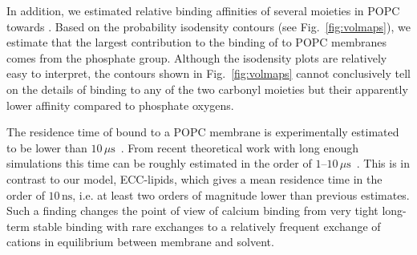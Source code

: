 \documentclass[aip,jcp,twocolumn]{revtex4}
\begin{document}
In addition, we estimated relative binding affinities 
of several moieties in POPC towards . 
Based on the probability isodensity contours (see Fig.~\ref{fig:volmaps}), 
we estimate that the largest contribution
to the binding of  to POPC membranes comes from the phosphate group. 
Although the isodensity plots are relatively easy to interpret,
the contours shown in Fig.~\ref{fig:volmaps} cannot conclusively tell on the details
of  binding to any of the two carbonyl moieties
but their apparently lower affinity compared to phosphate oxygens. 

The residence time of  bound to a POPC membrane 
is experimentally estimated to be lower than $10\,\mu\mathrm{s}$~\cite{altenbach84}. 
From recent theoretical work with long enough simulations this time can be roughly estimated
in the order of $1$--$10\,\mu\mathrm{s}$~\cite{javanainen17}. 
This is in contrast to our model, ECC-lipids, 
which gives a mean residence time in the order of $10\,\mathrm{ns}$, 
i.e. at least two orders of magnitude lower than previous estimates.
Such a finding changes the point of view of calcium binding from
very tight long-term stable binding with rare exchanges to 
a relatively frequent exchange of cations 
in equilibrium between membrane and solvent. 






\end{document}
